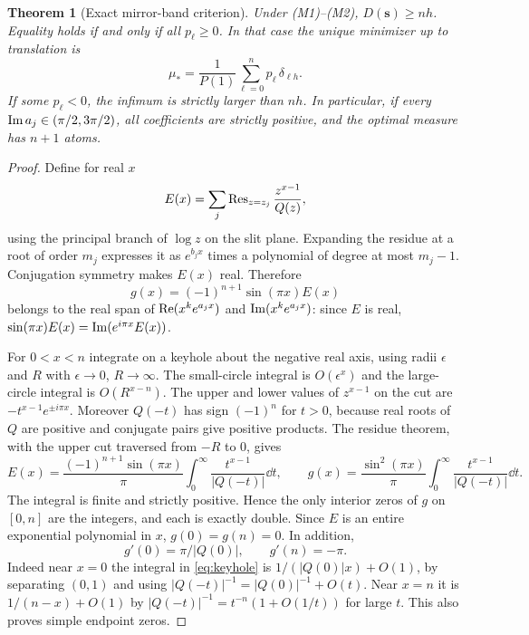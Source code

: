 \documentclass[11pt]{article}
\newtheorem{theorem}{Theorem}[section]
\theoremstyle{remark}\newtheorem{remark}[theorem]{Remark}
\begin{document}
\begin{theorem}[Exact mirror-band criterion]\label{thm:mirror}
Under (M1)--(M2), $D(\boldsymbol{s})\ge nh$. Equality holds if and only if all $p_\ell\ge0$. In that case the unique minimizer up to translation is
\begin{equation}\label{eq:optimal}
 \mu_* = \frac1{P(1)}\sum_{\ell=0}^np_\ell\,\delta_{\ell h}.
\end{equation}
If some $p_\ell<0$, the infimum is strictly larger than $nh$. In particular, if every $\operatorname{Im} a_j\in(\pi/2,3\pi/2)$, all coefficients are strictly positive, and the optimal measure has $n+1$ atoms.
\end{theorem}
\begin{proof}
Define for real $x$
\[
 E(x)=\sum_j\operatorname{Res}_{z=z_j}\frac{z^{x-1}}{Q(z)},
\]
using the principal branch of $\log z$ on the slit plane. Expanding the residue at a root of order $m_j$ expresses it as $e^{b_jx}$ times a polynomial of degree at most $m_j-1$. Conjugation symmetry makes $E(x)$ real. Therefore
\begin{equation}\label{eq:g}
 g(x)=(-1)^{n+1}\sin(\pi x)E(x)
\end{equation}
belongs to the real span of $\operatorname{Re}(x^k e^{a_jx})$ and $\operatorname{Im}(x^k e^{a_jx})$: since $E$ is real, $\sin(\pi x)E(x)=\operatorname{Im}(e^{i\pi x}E(x))$.

For $0<x<n$ integrate on a keyhole about the negative real axis, using radii $\epsilon$ and $R$ with $\epsilon\to0$, $R\to\infty$. The small-circle integral is $O(\epsilon^x)$ and the large-circle integral is $O(R^{x-n})$. The upper and lower values of $z^{x-1}$ on the cut are $-t^{x-1}e^{\pm i\pi x}$. Moreover $Q(-t)$ has sign $(-1)^n$ for $t>0$, because real roots of $Q$ are positive and conjugate pairs give positive products. The residue theorem, with the upper cut traversed from $-R$ to $0$, gives
\begin{equation}\label{eq:keyhole}
 E(x)=\frac{(-1)^{n+1}\sin(\pi x)}{\pi}\int_0^\infty\frac{t^{x-1}}{|Q(-t)|}\dd t,
 \qquad
 g(x)=\frac{\sin^2(\pi x)}{\pi}\int_0^\infty\frac{t^{x-1}}{|Q(-t)|}\dd t.
\end{equation}
The integral is finite and strictly positive. Hence the only interior zeros of $g$ on $[0,n]$ are the integers, and each is exactly double. Since $E$ is an entire exponential polynomial in $x$, $g(0)=g(n)=0$. In addition,
\begin{equation}\label{eq:slopes}
 g'(0)=\pi/|Q(0)|,\qquad g'(n)=-\pi.
\end{equation}
Indeed near $x=0$ the integral in \eqref{eq:keyhole} is $1/(|Q(0)|x)+O(1)$, by separating $(0,1)$ and using $|Q(-t)|^{-1}=|Q(0)|^{-1}+O(t)$. Near $x=n$ it is $1/(n-x)+O(1)$ by $|Q(-t)|^{-1}=t^{-n}(1+O(1/t))$ for large $t$. This also proves simple endpoint zeros.


\end{proof}
\end{document}
